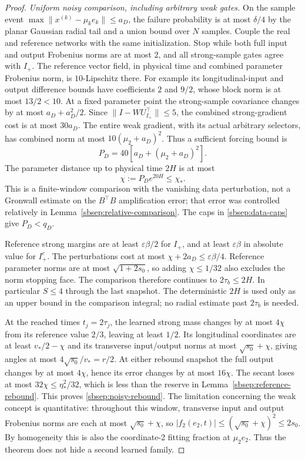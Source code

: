 \documentclass[11pt]{article}
\theoremstyle{remark}
\begin{document}
\begin{proof}
\emph{Uniform noisy comparison, including arbitrary weak gates.}
On the sample event $\max\|x^{(k)}-\mu_ke_k\|\le a_D$, the failure
probability is at most $\delta/4$ by the planar Gaussian radial tail
and a union bound over $N$ samples. Couple the real and reference
networks with the same initialization. Stop while both full input and
output Frobenius norms are at most $2$, and all strong-sample gates
agree with $I_+$. The reference vector field, in physical time and
combined parameter Frobenius norm, is $10$-Lipschitz there.
For example its longitudinal-input and output difference bounds have
coefficients $2$ and $9/2$, whose block norm is at most $13/2<10$.
At a fixed parameter point the strong-sample covariance changes by at
most $a_D+a_D^2/2$. Since $\|I-WU_{I_+}^\top\|\le5$, the combined
strong-gradient cost is at most $30a_D$. The entire weak gradient,
with its actual arbitrary selectors, has combined norm at most
$10(\mu_2+a_D)^2$. Thus a sufficient forcing bound is
\[
 P_D=40[a_D+(\mu_2+a_D)^2].
\]
The parameter distance up to physical time $2H$ is at most
\begin{equation}\label{sbsep:noisy-distance}
 \chi:=P_De^{20H}\le\chi_*.
\end{equation}
This is a finite-window comparison with the vanishing data perturbation,
not a Gronwall estimate on the $B^\top B$ amplification error; that error
was controlled relatively in Lemma~\ref{sbsep:relative-comparison}.
The caps in \eqref{sbsep:data-caps} give $P_D<q_D$.

Reference strong margins are at least $\varepsilon\beta/2$ for $I_+$,
and at least $\varepsilon\beta$ in absolute value for $I_+^c$.
The perturbations cost at most $\chi+2a_D\le\varepsilon\beta/4$.
Reference parameter norms are at most $\sqrt{1+2s_0}$, so adding
$\chi\le1/32$ also excludes the norm stopping face. The comparison
therefore continues to $2\tau_b\le2H$. In particular $S\le4$
through the last snapshot. The deterministic $2H$ is used only as an
upper bound in the comparison integral; no radial estimate past
$2\tau_b$ is needed.

At the reached times $t_j=2\tau_j$, the learned strong mass changes
by at most $4\chi$ from its reference value $2/3$, leaving at least
$1/2$. Its longitudinal coordinates are at least $v_*/2-\chi$ and its
transverse input/output norms at most $\sqrt{s_0}+\chi$, giving angles
at most $4\sqrt{s_0}/v_*=r/2$. At either rebound snapshot the full
output changes by at most $4\chi$, hence its error changes by at most
$16\chi$. The secant loses at most $32\chi\le\eta_*^2/32$, which is
less than the reserve in Lemma~\ref{sbsep:reference-rebound}.
This proves \eqref{sbsep:noisy-rebound}.
The limitation concerning the weak concept is quantitative: throughout this
window, transverse input and output Frobenius norms are each at most
$\sqrt{s_0}+\chi$, so
$|f_2(e_2,t)|\le(\sqrt{s_0}+\chi)^2\le2s_0$.
By homogeneity this is also the coordinate-2 fitting fraction at
$\mu_2e_2$. Thus the theorem does not hide a second learned family.


\end{proof}
\end{document}
